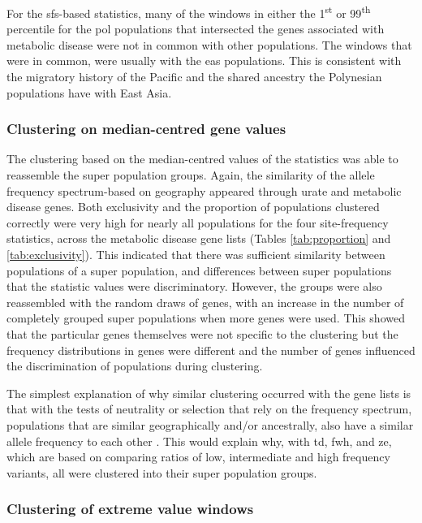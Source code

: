 \documentclass[]{report}
\begin{document}
For the \gls{sfs}-based statistics, many of the windows in either the
1\textsuperscript{st} or 99\textsuperscript{th} percentile for the
\gls{pol} populations that intersected the genes associated with
metabolic disease were not in common with other populations. The windows
that were in common, were usually with the \gls{eas} populations. This
is consistent with the migratory history of the Pacific and the shared
ancestry the Polynesian populations have with East Asia.

\subsubsection{Clustering on median-centred gene
values}\label{clustering-on-median-centred-gene-values}

The clustering based on the median-centred values of the statistics was
able to reassemble the super population groups. Again, the similarity of
the allele frequency spectrum-based on geography appeared through urate
and metabolic disease genes. Both exclusivity and the proportion of
populations clustered correctly were very high for nearly all
populations for the four site-frequency statistics, across the metabolic
disease gene lists (Tables \ref{tab:proportion} and
\ref{tab:exclusivity}). This indicated that there was sufficient
similarity between populations of a super population, and differences
between super populations that the statistic values were discriminatory.
However, the groups were also reassembled with the random draws of
genes, with an increase in the number of completely grouped super
populations when more genes were used. This showed that the particular
genes themselves were not specific to the clustering but the frequency
distributions in genes were different and the number of genes influenced
the discrimination of populations during clustering.

The simplest explanation of why similar clustering occurred with the
gene lists is that with the tests of neutrality or selection that rely
on the frequency spectrum, populations that are similar geographically
and/or ancestrally, also have a similar allele frequency to each other
\citep{Gravel2011}. This would explain why, with \gls{td}, \gls{fwh},
and \gls{ze}, which are based on comparing ratios of low, intermediate
and high frequency variants, all were clustered into their super
population groups.

\subsubsection{Clustering of extreme value
windows}\label{clustering-of-extreme-value-windows}
\end{document}
